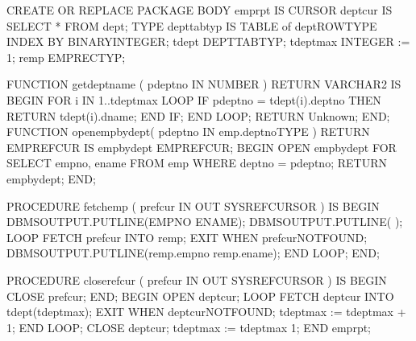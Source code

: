 \documentclass[letterpaper,10pt,english,openany,oneside]{sphinxmanual}
\begin{document}
%
\begin{sphinxVerbatim}[commandchars=\\\{\}]
CREATE OR REPLACE PACKAGE BODY emp\PYGZus{}rpt
IS
    CURSOR dept\PYGZus{}cur IS SELECT * FROM dept;
    TYPE depttab\PYGZus{}typ IS TABLE of dept\PYGZpc{}ROWTYPE
        INDEX BY BINARY\PYGZus{}INTEGER;
    t\PYGZus{}dept          DEPTTAB\PYGZus{}TYP;
    t\PYGZus{}dept\PYGZus{}max      INTEGER := 1;
    r\PYGZus{}emp           EMPREC\PYGZus{}TYP;

    FUNCTION get\PYGZus{}dept\PYGZus{}name (
        p\PYGZus{}deptno    IN NUMBER
    ) RETURN VARCHAR2
    IS
    BEGIN
        FOR i IN 1..t\PYGZus{}dept\PYGZus{}max LOOP
            IF p\PYGZus{}deptno = t\PYGZus{}dept(i).deptno THEN
                RETURN t\PYGZus{}dept(i).dname;
            END IF;
        END LOOP;
        RETURN \PYGZsq{}Unknown\PYGZsq{};
  END;
  FUNCTION open\PYGZus{}emp\PYGZus{}by\PYGZus{}dept(
    p\PYGZus{}deptno        IN emp.deptno\PYGZpc{}TYPE
  ) RETURN EMP\PYGZus{}REFCUR
  IS
    emp\PYGZus{}by\PYGZus{}dept EMP\PYGZus{}REFCUR;
  BEGIN
    OPEN emp\PYGZus{}by\PYGZus{}dept FOR SELECT empno, ename FROM emp
        WHERE deptno = p\PYGZus{}deptno;
    RETURN emp\PYGZus{}by\PYGZus{}dept;
  END;

  PROCEDURE fetch\PYGZus{}emp (
      p\PYGZus{}refcur      IN OUT SYS\PYGZus{}REFCURSOR
  )
  IS
  BEGIN
      DBMS\PYGZus{}OUTPUT.PUT\PYGZus{}LINE(\PYGZsq{}EMPNO ENAME\PYGZsq{});
      DBMS\PYGZus{}OUTPUT.PUT\PYGZus{}LINE(\PYGZsq{}\PYGZhy{}\PYGZhy{}\PYGZhy{}\PYGZhy{}\PYGZhy{} \PYGZhy{}\PYGZhy{}\PYGZhy{}\PYGZhy{}\PYGZhy{}\PYGZhy{}\PYGZhy{}\PYGZsq{});
      LOOP
          FETCH p\PYGZus{}refcur INTO r\PYGZus{}emp;
          EXIT WHEN p\PYGZus{}refcur\PYGZpc{}NOTFOUND;
          DBMS\PYGZus{}OUTPUT.PUT\PYGZus{}LINE(r\PYGZus{}emp.empno \textbar{}\textbar{} \PYGZsq{} \PYGZsq{} \textbar{}\textbar{} r\PYGZus{}emp.ename);
      END LOOP;
  END;

  PROCEDURE close\PYGZus{}refcur (
      p\PYGZus{}refcur      IN OUT SYS\PYGZus{}REFCURSOR
  )
  IS
  BEGIN
      CLOSE p\PYGZus{}refcur;
  END;
BEGIN
  OPEN dept\PYGZus{}cur;
  LOOP
      FETCH dept\PYGZus{}cur INTO t\PYGZus{}dept(t\PYGZus{}dept\PYGZus{}max);
      EXIT WHEN dept\PYGZus{}cur\PYGZpc{}NOTFOUND;
      t\PYGZus{}dept\PYGZus{}max := t\PYGZus{}dept\PYGZus{}max + 1;
  END LOOP;
  CLOSE dept\PYGZus{}cur;
  t\PYGZus{}dept\PYGZus{}max := t\PYGZus{}dept\PYGZus{}max \PYGZhy{} 1;
END emp\PYGZus{}rpt;
\end{sphinxVerbatim}
\end{document}
